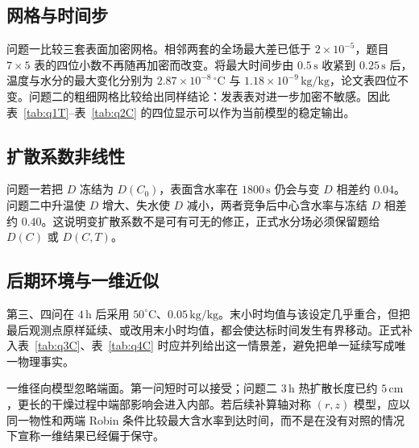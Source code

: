 \subsection{网格与时间步}

问题一比较三套表面加密网格。相邻两套的全场最大差已低于 $2\times10^{-5}$，题目 $7\times5$ 表的四位小数不再随再加密而改变。将最大时间步由 $0.5\,\mathrm{s}$ 收紧到 $0.25\,\mathrm{s}$ 后，温度与水分的最大变化分别为 $2.87\times10^{-8}\,{}^\circ\mathrm{C}$ 与 $1.18\times10^{-9}\,\mathrm{kg/kg}$，论文表四位不变。问题二的粗细网格比较给出同样结论：发表表对进一步加密不敏感。因此表~\ref{tab:q1T}--表~\ref{tab:q2C} 的四位显示可以作为当前模型的稳定输出。

\subsection{扩散系数非线性}

问题一若把 $D$ 冻结为 $D(C_0)$，表面含水率在 $1800\,\mathrm{s}$ 仍会与变 $D$ 相差约 $0.04$。问题二中升温使 $D$ 增大、失水使 $D$ 减小，两者竞争后中心含水率与冻结 $D$ 相差约 $0.40$。这说明变扩散系数不是可有可无的修正，正式水分场必须保留题给 $D(C)$ 或 $D(C,T)$。

\subsection{后期环境与一维近似}

第三、四问在 $4\,\mathrm{h}$ 后采用 $50^\circ\mathrm{C}$、$0.05\,\mathrm{kg/kg}$。末小时均值与该设定几乎重合，但把最后观测点原样延续、或改用末小时均值，都会使达标时间发生有界移动。正式补入表~\ref{tab:q3C}、表~\ref{tab:q4C} 时应并列给出这一情景差，避免把单一延续写成唯一物理事实。

一维径向模型忽略端面。第一问短时可以接受；问题二 $3\,\mathrm{h}$ 热扩散长度已约 $5\,\mathrm{cm}$，更长的干燥过程中端部影响会进入内部。若后续补算轴对称 $(r,z)$ 模型，应以同一物性和两端 Robin 条件比较最大含水率到达时间，而不是在没有对照的情况下宣称一维结果已经偏于保守。
